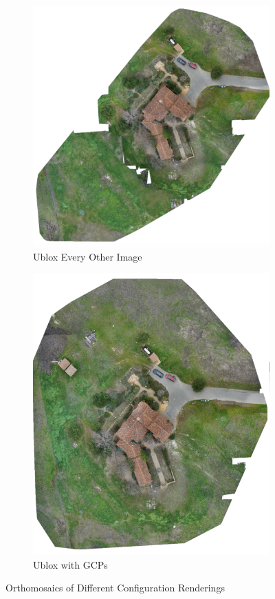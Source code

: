 \documentclass{article}
\begin{document}
\begin{figure}
\begin{subfigure}{.33\textwidth}
  \includegraphics[width=.75\linewidth]{images/orthomosaics/ublox_every_other_image.png}
  \caption{Ublox Every Other Image}
  \label{fig:sub1}
\end{subfigure}%
\begin{subfigure}{.33\textwidth}
  \centering
  \includegraphics[width=.75\linewidth]{images/orthomosaics/ublox_gcp.png}
  \caption{Ublox with GCPs}
  \label{fig:sub1}
\end{subfigure}%
\caption{Orthomosaics of Different Configuration Renderings}
\label{ortho}
\end{figure}
\end{document}
